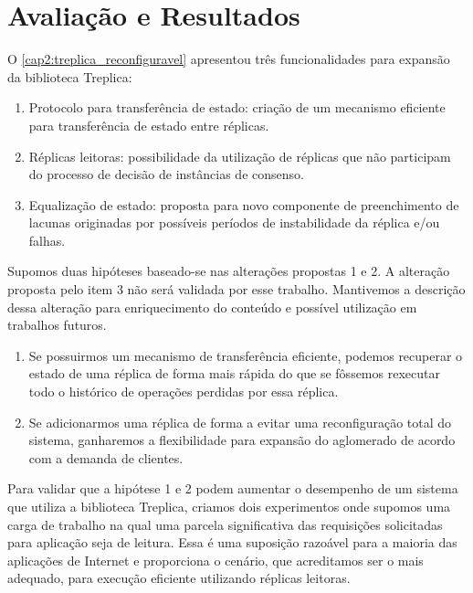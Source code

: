 \chapter{Avaliação e Resultados}\label{cap3}

O \autoref{cap2:treplica_reconfiguravel} apresentou três funcionalidades para expansão da
biblioteca Treplica:

\begin{enumerate}
  \item Protocolo para transferência de estado: criação de um mecanismo eficiente para
    transferência de estado entre réplicas.
  \item Réplicas leitoras: possibilidade da utilização de réplicas que não participam do
    processo de decisão de instâncias de consenso.
  \item Equalização de estado: proposta para novo componente de preenchimento de lacunas
    originadas por possíveis períodos de instabilidade da réplica e/ou falhas.
\end{enumerate}

Supomos duas hipóteses baseado-se nas alterações propostas 1 e 2. A alteração proposta
pelo item 3 não será validada por esse trabalho. Mantivemos a descrição dessa alteração
para enriquecimento do conteúdo e possível utilização em trabalhos futuros.

\begin{enumerate}
  \item Se possuirmos um mecanismo de transferência eficiente, podemos recuperar o estado
    de uma réplica de forma mais rápida do que se fôssemos rexecutar todo o histórico de
    operações perdidas por essa réplica.
  \item Se adicionarmos uma réplica de forma a evitar uma reconfiguração total do sistema,
    ganharemos a flexibilidade para expansão do aglomerado de acordo com a demanda de
    clientes.
\end{enumerate}

Para validar que a hipótese 1 e 2 podem aumentar o desempenho de um sistema que utiliza a
biblioteca Treplica, criamos dois experimentos onde supomos uma carga de trabalho na qual
uma parcela significativa das requisições solicitadas para aplicação seja de leitura. Essa
é uma suposição razoável para a maioria das aplicações de Internet \cite{tpc02} e
proporciona o cenário, que acreditamos ser o mais adequado, para execução eficiente
utilizando réplicas leitoras.

